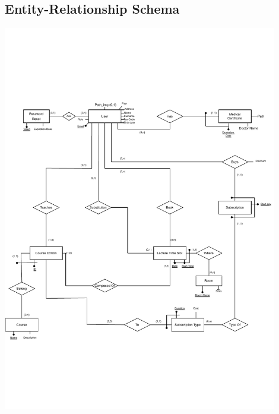 \subsection{Entity-Relationship Schema}

    \begin{center}
        \includegraphics[width=0.9\textwidth]{resources/ER_restructured_v2.pdf}
    \end{center}


